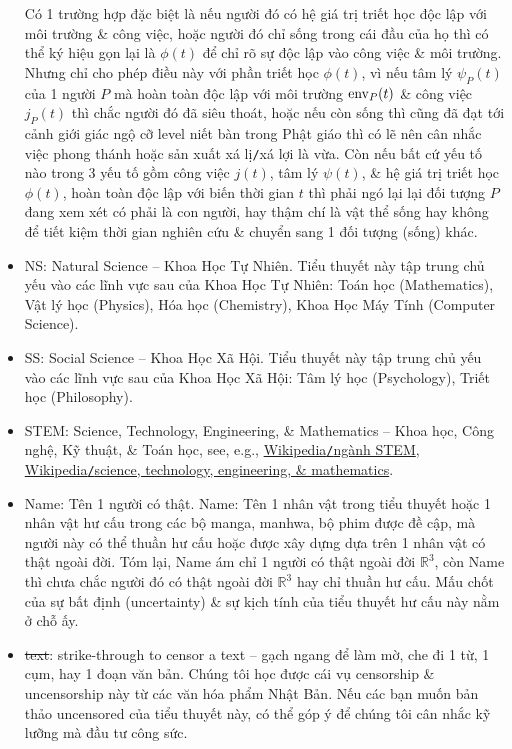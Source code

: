 \documentclass[12pt,twoside]{book}
\begin{document}
\begin{itemize}
	Có 1 trường hợp đặc biệt là nếu người đó có hệ giá trị triết học độc lập với môi trường \& công việc, hoặc người đó chỉ sống trong cái đầu của họ thì có thể ký hiệu gọn lại là $\phi(t)$ để chỉ rõ sự độc lập vào công việc \& môi trường. Nhưng chỉ cho phép điều này với phần triết học $\phi(t)$, vì nếu tâm lý $\psi_P(t)$ của 1 người $P$ mà hoàn toàn độc lập với môi trường ${\rm env}_P(t)$ \& công việc $j_P(t)$ thì chắc người đó đã siêu thoát, hoặc nếu còn sống thì cũng đã đạt tới cảnh giới giác ngộ cỡ level niết bàn trong Phật giáo thì có lẽ nên cân nhắc việc phong thánh hoặc sản xuất xá lị{\tt/}xá lợi là vừa. Còn nếu bất cứ yếu tố nào trong 3 yếu tố gồm công việc $j(t)$, tâm lý $\psi(t)$, \& hệ giá trị triết học $\phi(t)$, hoàn toàn độc lập với biến thời gian $t$ thì phải ngó lại lại đối tượng $P$ đang xem xét có phải là con người, hay thậm chí là vật thể sống hay không để tiết kiệm thời gian nghiên cứu \& chuyển sang 1 đối tượng (sống) khác.
	\item NS: Natural Science -- Khoa Học Tự Nhiên. Tiểu thuyết này tập trung chủ yếu vào các lĩnh vực sau của Khoa Học Tự Nhiên: Toán học (Mathematics), Vật lý học (Physics), Hóa học (Chemistry), Khoa Học Máy Tính (Computer Science).
	\item SS: Social Science -- Khoa Học Xã Hội. Tiểu thuyết này tập trung chủ yếu vào các lĩnh vực sau của Khoa Học Xã Hội: Tâm lý học (Psychology), Triết học (Philosophy).
	\item STEM: Science, Technology, Engineering, \& Mathematics -- Khoa học, Công nghệ, Kỹ thuật, \& Toán học, see, e.g., \href{https://vi.wikipedia.org/wiki/Ng%C3%A0nh_STEM}{Wikipedia{\tt/}ngành STEM}, \href{https://en.wikipedia.org/wiki/Science,_technology,_engineering,_and_mathematics}{Wikipedia{\tt/}science, technology, engineering, \& mathematics}.
	\item {\sc Name}: Tên 1 người có thật. {\sf Name}: Tên 1 nhân vật trong tiểu thuyết hoặc 1 nhân vật hư cấu trong các bộ manga, manhwa, bộ phim được đề cập, mà người này có thể thuần hư cấu hoặc được xây dựng dựa trên 1 nhân vật có  thật ngoài đời. Tóm lại, {\sc Name} ám chỉ 1 người có thật ngoài đời $\mathbb{R}^3$, còn {\sf Name} thì chưa chắc người đó có thật ngoài đời $\mathbb{R}^3$ hay chỉ thuần hư cấu. Mấu chốt của sự bất định (uncertainty) \& sự kịch tính của tiểu thuyết hư cấu này nằm ở chỗ ấy.
	\item \st{text}: strike-through to censor a text -- gạch ngang để làm mờ, che đi 1 từ, 1 cụm, hay 1 đoạn văn bản. Chúng tôi học được cái vụ censorship \& uncensorship này từ các văn hóa phẩm Nhật Bản. Nếu các bạn muốn bản thảo uncensored của tiểu thuyết này, có thể góp ý để chúng tôi cân nhắc kỹ lưỡng mà đầu tư công sức.
\end{itemize}
\end{document}
